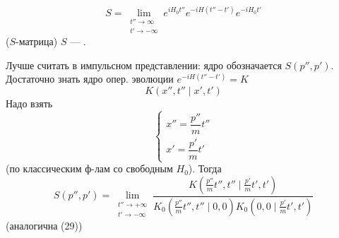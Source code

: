 \begin{equation*}
S=\lim_{\substack{t''\to\infty\\t'\to-\infty}}
e^{iH_0t''}e^{-iH(t''-t')}e^{-iH_0t'}
\tag{29}
\end{equation*}
(\(S\)-матрица)  \(S\) --- .

Лучше считать в импульсном представлении: ядро обозначается \(S(p'',p')\). Достаточно знать ядро опер. эволюции
\(e^{-iH(t''-t')}=K\)
\[
K(x'',t''\mid x',t')
\]
Надо взять
\begin{equation*}
\begin{cases}
x''=\dfrac{p''}{m}t''\\
x'=\dfrac{p'}{m}t'
\end{cases}
\tag{30}
\end{equation*}
(по классическим ф-лам со свободным \(H_0\)). Тогда
\begin{equation*}
S(p'',p')=\lim_{\substack{t''\to+\infty\\t'\to-\infty}}
\frac{K\left(\frac{p''}{m}t'',t''\mid\frac{p'}{m}t',t'\right)}
{K_0\left(\frac{p''}{m}t'',t''\mid0,0\right)
K_0\left(0,0\mid\frac{p'}{m}t',t'\right)}
\tag{31}
\end{equation*}
(аналогична (29))


